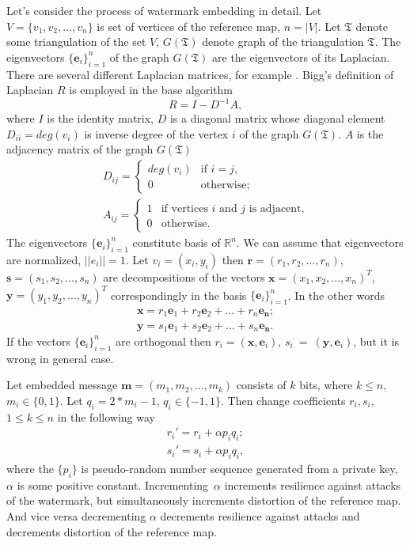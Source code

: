 \documentclass{article}
\begin{document}
Let's consider the process of watermark embedding in detail. Let $V = \{v_1, v_2, \dots, v_n\}$ is set of vertices of the reference map, $n = |V|$. Let $\mathfrak{T}$ denote some triangulation of the set $V$, 
$G(\mathfrak{T})$ denote graph of the triangulation $\mathfrak{T}$. The eigenvectors $\{\mathbf{e}_i\}_{i=1}^n$ of the graph $G(\mathfrak{T})$ are the eigenvectors of its Laplacian. 
There are several different Laplacian matrices, for example \cite{Biggs, Chung, Zhang}. Bigg's definition of Laplacian $R$ is employed in the base algorithm
$$R = I - D^{-1} A,$$ where $I$ is the identity matrix, $D$ is a diagonal matrix whose diagonal element $D_{ii} = deg(v_i)$ is inverse degree of the vertex $i$ of the graph $G(\mathfrak{T})$. 
$A$ is the adjacency matrix of the graph $G(\mathfrak{T})$
\begin{eqnarray*}
  D_{ij} = \begin{cases} deg(v_i) &\text{if $i = j$,} \\ 0 &\text{otherwise;} \end{cases} \\
  A_{ij} = \begin{cases} 1 &\text{if vertices $i$ and $j$ is adjacent,} \\ 0 &\text{otherwise.} \end{cases} 
\end{eqnarray*}
The eigenvectors $\{\mathbf{e}_i\}_{i=1}^n$ constitute basis of $\mathbb{R}^n$. We can assume that eigenvectors are normalized, $||e_i|| = 1$. 
Let $v_i = (x_i, y_i)$ then $\mathbf{r} = (r_1, r_2, \dots, r_n)$, $\mathbf{s} = (s_1, s_2, \dots, s_n)$ are decompositions of the vectors $\mathbf{x} = (x_1, x_2, \dots, x_n)^T$, 
$\mathbf{y} = (y_1, y_2, \dots, y_n)^T$ correspondingly in the basis $\{\mathbf{e}_i\}_{i=1}^n$. In the other words 
\begin{eqnarray*}
  \mathbf{x} = r_1 \mathbf{e}_1 + r_2 \mathbf{e}_2 + \dots + r_n \mathbf{e_n}; \\ 
  \mathbf{y} = s_1 \mathbf{e}_1 + s_2 \mathbf{e}_2 + \dots + s_n \mathbf{e_n}.  
\end{eqnarray*}
If the vectors $\{\mathbf{e}_i\}_{i=1}^n$ are orthogonal then $r_i = (\mathbf{x}, \mathbf{e}_i)$, $s_i~=~(\mathbf{y}, \mathbf{e}_i)$, but it is wrong in general case. 

Let embedded message $\mathbf{m} = (m_1, m_2, \dots, m_k)$ consists of $k$ bits, where $k \le n$, $m_i \in \{0, 1\}$. Let $q_i = 2 * m_i - 1$, $q_i \in \{-1, 1\}$.
Then change coefficients $r_i, s_i$, $1 \le k \le n$ in the following way
\begin{eqnarray*}
  r_i' = r_i + \alpha p_i q_i; \\
  s_i' = s_i + \alpha p_i q_i, 
\end{eqnarray*}
where the $\{p_i\}$ is pseudo-random number sequence generated from a private key, $\alpha$ is some positive constant. Incrementing~$\alpha$ increments resilience against attacks of the watermark, 
but simultaneously increments distortion of the reference map. And vice versa decrementing $\alpha$ decrements resilience against attacks and decrements distortion of the reference map.
\end{document}
